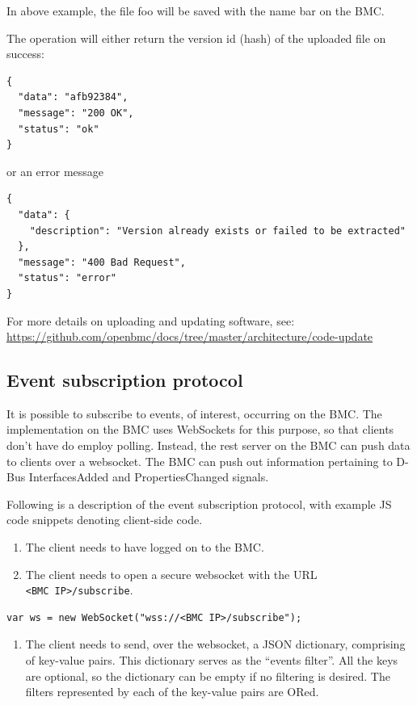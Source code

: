 In above example, the file foo will be saved with the name bar on the
BMC.

The operation will either return the version id (hash) of the uploaded
file on success:

\begin{verbatim}
{
  "data": "afb92384",
  "message": "200 OK",
  "status": "ok"
}
\end{verbatim}

or an error message

\begin{verbatim}
{
  "data": {
    "description": "Version already exists or failed to be extracted"
  },
  "message": "400 Bad Request",
  "status": "error"
}
\end{verbatim}

For more details on uploading and updating software, see:
\url{https://github.com/openbmc/docs/tree/master/architecture/code-update}

\hypertarget{event-subscription-protocol}{%
\subsection{Event subscription
protocol}\label{event-subscription-protocol}}

It is possible to subscribe to events, of interest, occurring on the
BMC. The implementation on the BMC uses WebSockets for this purpose, so
that clients don't have do employ polling. Instead, the rest server on
the BMC can push data to clients over a websocket. The BMC can push out
information pertaining to D-Bus InterfacesAdded and PropertiesChanged
signals.

Following is a description of the event subscription protocol, with
example JS code snippets denoting client-side code.

\begin{enumerate}
\def\labelenumi{\alph{enumi}.}
\item
  The client needs to have logged on to the BMC.
\item
  The client needs to open a secure websocket with the URL
  \texttt{\textless{}BMC\ IP\textgreater{}/subscribe}.
\end{enumerate}

\begin{verbatim}
var ws = new WebSocket("wss://<BMC IP>/subscribe");
\end{verbatim}

\begin{enumerate}
\def\labelenumi{\alph{enumi}.}
\setcounter{enumi}{2}
\tightlist
\item
  The client needs to send, over the websocket, a JSON dictionary,
  comprising of key-value pairs. This dictionary serves as the ``events
  filter''. All the keys are optional, so the dictionary can be empty if
  no filtering is desired. The filters represented by each of the
  key-value pairs are ORed.
\end{enumerate}


